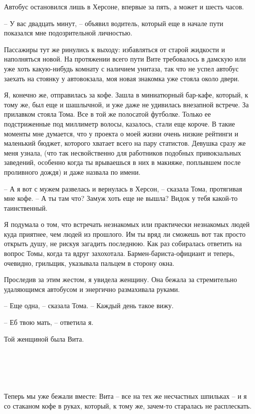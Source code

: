 \documentclass[
]{book}
\begin{document}
Автобус остановился лишь в Херсоне, впервые за пять, а может и шесть часов.

-- У вас двадцать минут, -- объявил водитель, который еще в начале пути показался мне подозрительной личностью.

Пассажиры тут же ринулись к выходу: избавляться от старой жидкости и наполняться новой. На протяжении всего пути Вите требовалось в дамскую или уже хоть какую-нибудь комнату с наличием унитаза, так что не успел автобус заехать на стоянку у автовокзала, моя новая знакомка уже стояла около двери.

Я, конечно же, отправилась за кофе. Зашла в миниатюрный бар-кафе, который, к тому же, был еще и шашлычной, и уже даже не удивилась внезапной встрече. За прилавком стояла Тома. Все в той же полосатой футболке. Только ее подстриженные под миллиметр волосы, казалось, стали еще короче. В такие моменты мне думается, что у проекта о моей жизни очень низкие рейтинги и маленький бюджет, которого хватает всего на пару статистов. Девушка сразу же меня узнала, (что так несвойственно для работников подобных привокзальных заведений, особенно когда ты врываешься в них в макияже, поплывшем после проливного дождя) и даже назвала по имени.

-- А я вот с мужем развелась и вернулась в Херсон, -- сказала Тома, протягивая мне кофе. -- А ты там что? Замуж хоть еще не вышла? Видок у тебя какой-то таинственный.

Я подумала о том, что встречать незнакомых или практически незнакомых людей куда приятнее, чем людей из прошлого. Им ты вряд ли сможешь вот так просто открыть душу, не рискуя загадить последнюю. Как раз собиралась ответить на вопрос Томы, когда та вдруг захохотала. Бармен-бариста-официант и теперь, очевидно, грильщик, указывала пальцем в сторону окна.

Проследив за этим жестом, я увидела женщину. Она бежала за стремительно удаляющимся автобусом и энергично размахивала руками.

-- Еще одна, -- сказала Тома. -- Каждый день такое вижу.

-- Еб твою мать, -- ответила я.

Той женщиной была Вита.

\hypertarget{chapter-40}{%
\chapter{~}\label{chapter-40}}

Теперь мы уже бежали вместе: Вита -- все на тех же несчастных шпильках -- и я со стаканом кофе в руках, который, к тому же, зачем-то старалась не расплескать.
\end{document}
